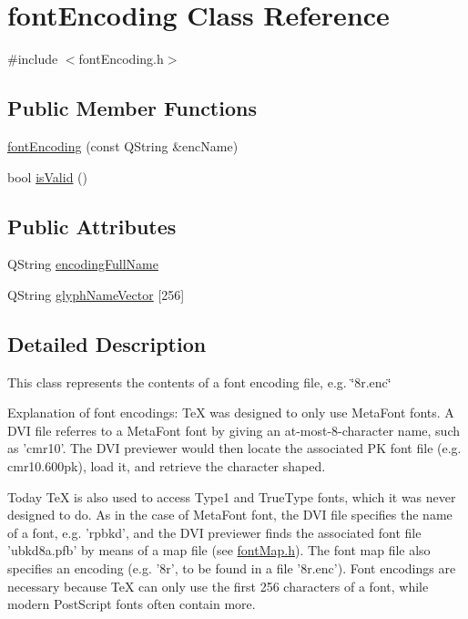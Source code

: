 \hypertarget{classfontEncoding}{\section{font\+Encoding Class Reference}
\label{classfontEncoding}
}


{\ttfamily \#include $<$font\+Encoding.\+h$>$}

\subsection*{Public Member Functions}
\begin{DoxyCompactItemize}
\item 
\hyperlink{classfontEncoding_a2c8b660e87dc1ef111639689ae2de64d}{font\+Encoding} (const Q\+String \&enc\+Name)
\item 
bool \hyperlink{classfontEncoding_a7d8f02901f8a855b48ed24a323d7035e}{is\+Valid} ()
\end{DoxyCompactItemize}
\subsection*{Public Attributes}
\begin{DoxyCompactItemize}
\item 
Q\+String \hyperlink{classfontEncoding_adfed214174b34402c6f775d13781edf0}{encoding\+Full\+Name}
\item 
Q\+String \hyperlink{classfontEncoding_a57d30426a088ea90d8645031fea6ef06}{glyph\+Name\+Vector} \mbox{[}256\mbox{]}
\end{DoxyCompactItemize}


\subsection{Detailed Description}
This class represents the contents of a font encoding file, e.\+g. \char`\"{}8r.\+enc\char`\"{}

Explanation of font encodings\+: Te\+X was designed to only use Meta\+Font fonts. A D\+V\+I file referres to a Meta\+Font font by giving an at-\/most-\/8-\/character name, such as 'cmr10'. The D\+V\+I previewer would then locate the associated P\+K font file (e.\+g. cmr10.\+600pk), load it, and retrieve the character shaped.

Today Te\+X is also used to access Type1 and True\+Type fonts, which it was never designed to do. As in the case of Meta\+Font font, the D\+V\+I file specifies the name of a font, e.\+g. 'rpbkd', and the D\+V\+I previewer finds the associated font file 'ubkd8a.\+pfb' by means of a map file (see \hyperlink{fontMap_8h}{font\+Map.\+h}). The font map file also specifies an encoding (e.\+g. '8r', to be found in a file '8r.\+enc'). Font encodings are necessary because Te\+X can only use the first 256 characters of a font, while modern Post\+Script fonts often contain more.

